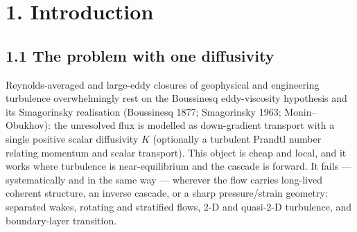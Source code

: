\documentclass[aps,prfluids,preprint,superscriptaddress,nofootinbib]{revtex4-2}
\begin{document}
\begin{abstract}
is up-gradient over \textbf{\textasciitilde{}48 \%} of space, which a positive-definite eddy viscosity represents at \textbf{0 \%}. Scope is explicit: a-priori, periodic, in 2-D and 3-D; the clean FDT/projection commutation is special to the spectral box and does not survive solid walls --- a wall-bounded test confirms this, the commutator $[F,\mathbb{P}]$ (machine-zero in the box) rising to $O(10^{-2})$ near the wall ($34\times$ the bulk). A time-integrated \textbf{a-posteriori} test confirms all variants stable and Smagorinsky over-dissipative in both 2-D and 3-D, while bounding the benefit: in 2-D no eddy-viscosity closure beats no-model on the resolved spectrum, and in a 3-D 7-seed ensemble at mild subgrid load the resolved-spectrum margin over no-model is at realization noise ($p=0.69$), with the a-priori forward-cascade direction ($\langle \Pi \rangle >0$, backscatter over $\sim$48\% of space) the robust 3-D structural result. The contribution is the audit, the scalar-independent memory time, the cleaning window, and the a-posteriori bound — not a universal closure.
\end{abstract}

\maketitle

\section*{1. Introduction}

\subsection*{1.1 The problem with one diffusivity}

Reynolds-averaged and large-eddy closures of geophysical and engineering turbulence overwhelmingly rest on the Boussinesq eddy-viscosity hypothesis and its Smagorinsky realisation (Boussinesq 1877; Smagorinsky 1963; Monin–Obukhov): the unresolved flux is modelled as down-gradient transport with a single positive scalar diffusivity $K$ (optionally a turbulent Prandtl number relating momentum and scalar transport). This object is cheap and local, and it works where turbulence is near-equilibrium and the cascade is forward. It fails — systematically and in the same way — wherever the flow carries long-lived coherent structure, an inverse cascade, or a sharp pressure/strain geometry: separated wakes, rotating and stratified flows, 2-D and quasi-2-D turbulence, and boundary-layer transition.
\end{document}
